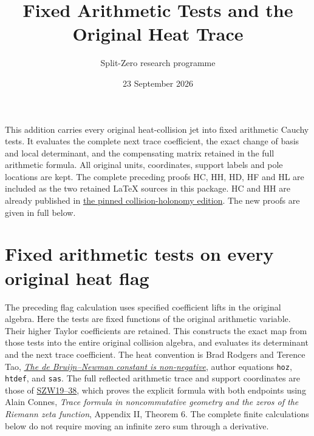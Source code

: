 \documentclass[11pt,a4paper]{article}
\title{Fixed Arithmetic Tests and the Original Heat Trace}
\author{Split-Zero research programme}
\date{23 September 2026}
\theoremstyle{definition}\newtheorem{definition}[theorem]{Definition}
\begin{document}
\maketitle
This addition carries every original heat-collision jet into fixed
arithmetic Cauchy tests. It evaluates the complete next trace
coefficient, the exact change of basis and local determinant,
and the compensating matrix retained in the full arithmetic formula.
All original units, coordinates, support labels and pole locations
are kept. The complete preceding proofs HC, HH, HD, HF and HL are
included as the two retained LaTeX sources in this package.
HC and HH are already published in
\href{https://github.com/KokunoYumeto/zeta-function-research-reader/tree/3c022a0adde0a6aa3d8fc8e43ef42795d88e44b0/workbenches/splitzero-tandem/continuations/20260923-supported-zero-collision-holonomy}{the pinned collision-holonomy edition}.
The new proofs are given in full below.
\medskip
\section{Fixed arithmetic tests on every original heat flag}
\label{sec:fixed-arithmetic-heat-flags}

The preceding flag calculation uses specified coefficient lifts in the
original algebra. Here the tests are fixed functions of the original
arithmetic variable. Their higher Taylor coefficients are retained.
This constructs the exact map from those tests into the entire original
collision algebra, and evaluates its determinant and the next trace
coefficient. The heat convention is Brad Rodgers and Terence Tao,
\href{https://arxiv.org/abs/1801.05914v5}{\emph{The de Bruijn--Newman
constant is non-negative}}, author equations \texttt{hoz},
\texttt{htdef}, and \texttt{sas}. The full reflected arithmetic trace
and support coordinates are those of
\href{https://github.com/KokunoYumeto/zeta-function-research-reader/blob/5a89872598df0902b7c1393cf8e4692ca3010a95/workbenches/splitzero-tandem/branches/tau-zero-prime-positivity/SUPPORTED_ZERO_PRIME_WEIL_DERIVATION.md}{SZW19--38},
which proves the explicit formula with both endpoints using Alain
Connes, \emph{Trace formula in noncommutative geometry and the zeros
of the Riemann zeta function}, Appendix II, Theorem 6.
The complete finite calculations below do not require moving an
infinite zero sum through a derivative.
\end{document}
